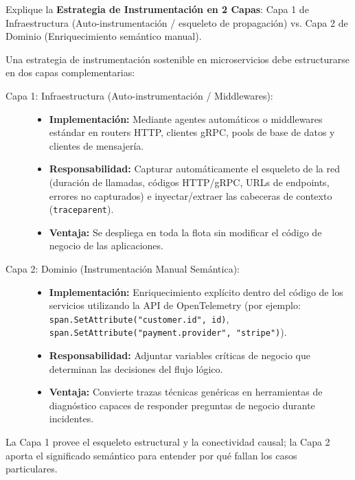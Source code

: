 \documentclass[variant=guia,cover=institutional,mode=screen]{ua-engineering-v6-article}
\begin{document}
\begin{uaexercise}
Explique la \textbf{Estrategia de Instrumentación en 2 Capas}: Capa 1 de Infraestructura (Auto-instrumentación / esqueleto de propagación) vs. Capa 2 de Dominio (Enriquecimiento semántico manual).
\end{uaexercise}
\begin{uaanswer}
Una estrategia de instrumentación sostenible en microservicios debe estructurarse en dos capas complementarias:
\begin{description}
\item[Capa 1: Infraestructura (Auto-instrumentación / Middlewares):]
\begin{itemize}
\item \textbf{Implementación:} Mediante agentes automáticos o middlewares estándar en routers HTTP, clientes gRPC, pools de base de datos y clientes de mensajería.
\item \textbf{Responsabilidad:} Capturar automáticamente el esqueleto de la red (duración de llamadas, códigos HTTP/gRPC, URLs de endpoints, errores no capturados) e inyectar/extraer las cabeceras de contexto (\texttt{traceparent}).
\item \textbf{Ventaja:} Se despliega en toda la flota sin modificar el código de negocio de las aplicaciones.
\end{itemize}
\item[Capa 2: Dominio (Instrumentación Manual Semántica):]
\begin{itemize}
\item \textbf{Implementación:} Enriquecimiento explícito dentro del código de los servicios utilizando la API de OpenTelemetry (por ejemplo: \texttt{span.SetAttribute("customer.id", id)}, \texttt{span.SetAttribute("payment.provider", "stripe")}).
\item \textbf{Responsabilidad:} Adjuntar variables críticas de negocio que determinan las decisiones del flujo lógico.
\item \textbf{Ventaja:} Convierte trazas técnicas genéricas en herramientas de diagnóstico capaces de responder preguntas de negocio durante incidentes.
\end{itemize}
\end{description}
La Capa 1 provee el esqueleto estructural y la conectividad causal; la Capa 2 aporta el significado semántico para entender por qué fallan los casos particulares.
\end{uaanswer}
\end{document}
